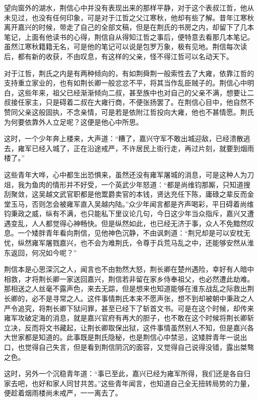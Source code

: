望向窗外的湖水，荆信心中并没有表现出来的那样平静，对于这个表叔江哲，他从未见过，也没有任何印象，可是对于江哲之父江寒秋，他却有些了解。昔年江寒秋离开嘉兴的时候，带走了自己的全部文稿，但是在荆氏的书房之内，却留下了几本笔记，上面有他读书的心得，荆信自从得知江哲之事后，便特意去看那几本笔记。虽然江寒秋籍籍无名，可是他的笔记可以说是包罗万象，极有见地。荆信每次读后，都有新的收获，不由叹息，有这样的父亲，怪不得江哲可以名动天下。

对于江哲，荆氏之内是有两种倾向的，有如荆舜荆一般索性去了大雍，依靠江哲的支持重立家业的，也有如荆长卿一般忿忿不平，将其当作乱臣贼子的。荆信心中明白，这些年来，祖父已经渐渐倾向二叔，甚至族中也对自己的父亲不满，想要让二叔接任家主，只是碍着二叔在大雍行商，不便张扬罢了。在荆信心目中，他自然不赞同父亲这般固执，不念亲情，可是若是依附江哲投向大雍，他也不甚情愿。荆氏为何要依靠外人立足呢？这便是他心中所思。

这时，一个少年奔上楼来，大声道：“糟了，嘉兴守军不敢出城迎敌，已经溃散逃去，雍军已经入城了，正在沿途戒严，不许居民上街行走，再过片刻，就要到烟雨楼了。”

这些青年大哗，心中都生出恐惧来，虽然还没有雍军屠城的消息，可是这种人为刀俎，我为鱼肉的情形并不好受，一个英武少年怒道：“都是尚维钧那厮，只知道搜刮聚敛，这吴越文武官职都是他鬻爵卖官的本钱，贤达充任下陈，庸碌之辈反而金堂玉马，否则怎会被雍军直入吴越内陆。”众少年闻言都是齐声喝彩，平日碍着尚维钧秉政之威，纵有不满，也只能私下里议论几句，今日这少年当众指斥，嘉兴又遭遇变乱，人人都觉得心神畅快。但是纵然如此，也已经无济于事，众人不免黯然叹息。一个矮胖青年看向荆信，见他神色沉静，不由讽刺道：“荆兄却是可以安枕无忧，纵然雍军屠戮嘉兴，也不会为难荆氏，令尊于兵荒马乱之中，还能够安然从淮东返回，何况如今呢？”

荆信本是心思深沉之人，闻言也不由勃然大怒，荆长卿在楚州遇险，幸好有人暗中相救，才将荆长卿一家送回嘉兴，荆信若非留在家乡侍奉祖父，也必然遭此劫难。那相送之人丝毫不露声色，来去无踪，但是想来也知道能够在淮东战乱之际救出荆长卿的，必不是寻常之人。这件事情荆氏本来不愿声张，想不到却被朝中秉政之人严令追究，将荆长卿下狱问罪，甚至已经下了斩首文书。可是在这个时候，却传来雍军攻破定海的消息，就是嘉兴官府有再大的胆子，也不敢在这个时候将荆长卿斩立决，反而将文书藏起，让荆长卿取保出狱，这件事情虽然别人不知，但是嘉兴各大世家都是知道的。此事既是荆氏隐秘，也是荆信心中禁忌，这矮胖青年一说出口，也觉得自己失言，但是看到荆信阴沉的面容，又觉得自己说得没错，露出桀骜之色。

这时，另外一个沉稳青年道：“事已至此，嘉兴已经为雍军所得，我们还是各自归家去吧，也好和家人同甘共苦。”这些青年闻言，也知道自己全无扭转局势的力量，便趁着烟雨楼尚未戒严，一一离去了。

